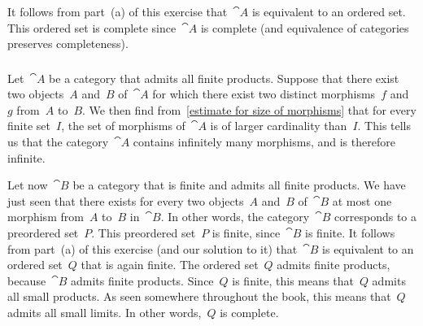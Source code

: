 It follows from part~(a) of this exercise that~$\cat{A}$ is equivalent to an ordered set.
This ordered set is complete since~$\cat{A}$ is complete (and equivalence of categories preserves completeness).



\subsubsection{}

Let~$\cat{A}$ be a category that admits all finite products.
Suppose that there exist two objects~$A$ and~$B$ of~$\cat{A}$ for which there exist two distinct morphisms~$f$ and~$g$ from~$A$ to~$B$.
We then find from~\eqref{estimate for size of morphisms} that for every finite set~$I$, the set of morphisms of~$\cat{A}$ is of larger cardinality than~$I$.
This tells us that the category~$\cat{A}$ contains infinitely many morphisms, and is therefore infinite.

Let now~$\cat{B}$ be a category that is finite and admits all finite products.
We have just seen that there exists for every two objects~$A$ and~$B$ of~$\cat{B}$ at most one morphism from~$A$ to~$B$ in~$\cat{B}$.
In other words, the category~$\cat{B}$ corresponds to a preordered set~$P$.
This preordered set~$P$ is finite, since~$\cat{B}$ is finite.
It follows from part~(a) of this exercise (and our solution to it) that~$\cat{B}$ is equivalent to an ordered set~$Q$ that is again finite.
The ordered set~$Q$ admits finite products, because~$\cat{B}$ admits finite products.
Since~$Q$ is finite, this means that~$Q$ admits all small products.
As seen somewhere throughout the book, this means that~$Q$ admits all small limits.
In other words,~$Q$ is complete.

